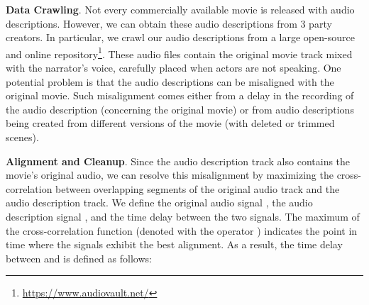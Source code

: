\documentclass[10pt,twocolumn,letterpaper]{article}
\renewcommand{\paragraph}[1]{\vspace{1mm}\noindent\textbf{#1}.}
\begin{document}
\paragraph{Data Crawling} Not every commercially available movie is released with audio descriptions. However, we can obtain these audio descriptions from 3 party creators. In particular, we crawl our audio descriptions from a large open-source and online repository\footnote{\url{https://www.audiovault.net/}}. 
These audio files contain the original movie track mixed with the narrator's voice, carefully placed when actors are not speaking.
One potential problem is that the audio descriptions can be misaligned with the original movie. Such misalignment comes either from a delay in the recording of the audio description (concerning the original movie) or from audio descriptions being created from different versions of the movie (with deleted or trimmed scenes). 

\paragraph{Alignment and Cleanup} Since the audio description track also contains the movie's original audio, we can resolve this misalignment by maximizing the cross-correlation between overlapping segments of the original audio track and the audio description track. We define the original audio signal , the audio description signal , and the time delay  between the two signals. The maximum of the cross-correlation function (denoted with the operator ) indicates the point in time where the signals exhibit the best alignment. As a result, the time delay  between  and  is defined as follows: 

\vspace{-0.2cm}
\end{document}
